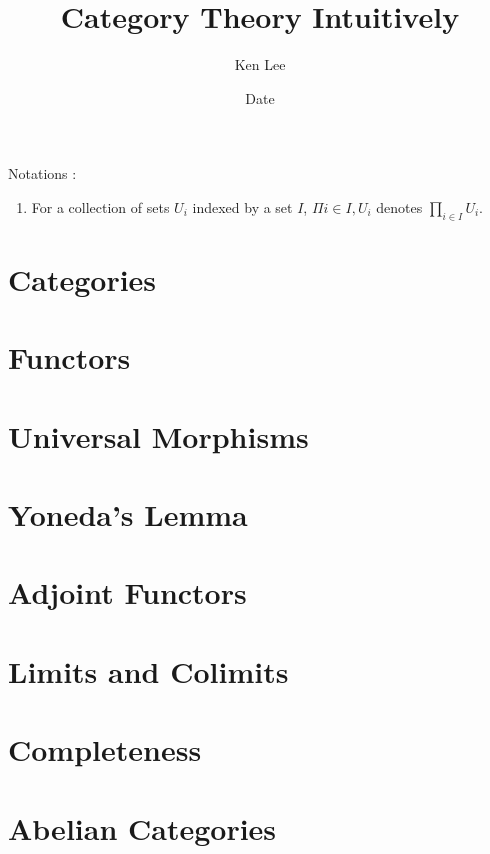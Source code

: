 \documentclass{article}
\newcommand{\<}{\langle}
\renewcommand{\>}{\rangle}
\begin{document}
\title{Category Theory Intuitively}
\author{Ken Lee}
\date{Date}
\maketitle

\tableofcontents

Notations : 
\begin{enumerate}
  \item For a collection of sets $U_i$ indexed by a set $I$, 
  $\Pi i \in I, U_i$ denotes $\prod_{i \in I} U_i$.
\end{enumerate}

\section{Categories}

\section{Functors}

\section{Universal Morphisms}

\section{Yoneda's Lemma}

\section{Adjoint Functors}

\section{Limits and Colimits}

\section{Completeness}

\section{Abelian Categories}

\end{document}
